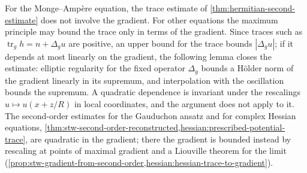 For the Monge--Amp\`ere equation, the trace estimate of \cref{thm:hermitian-second-estimate} does not involve the gradient. For other equations the maximum principle may bound the trace only in terms of the gradient. Since traces such as $\operatorname{tr}_gh=n+\Delta_gu$ are positive, an upper bound for the trace bounds $|\Delta_gu|$; if it depends at most linearly on the gradient, the following lemma closes the estimate: elliptic regularity for the fixed operator $\Delta_g$ bounds a H\"older norm of the gradient linearly in its supremum, and interpolation with the oscillation bounds the supremum. A quadratic dependence is invariant under the rescalings $u\mapsto u(x+z/R)$ in local coordinates, and the argument does not apply to it. The second-order estimates for the Gauduchon ansatz and for complex Hessian equations, \cref{thm:stw-second-order-reconstructed,hessian:prescribed-potential-trace}, are quadratic in the gradient; there the gradient is bounded instead by rescaling at points of maximal gradient and a Liouville theorem for the limit (\cref{prop:stw-gradient-from-second-order,hessian:hessian-trace-to-gradient}).

